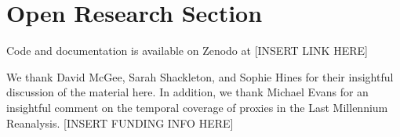 \documentclass[draft]{agujournal2019}
\begin{document}




%
%

\section*{Open Research Section}
Code and documentation is available on Zenodo at [INSERT LINK HERE]

\acknowledgments
We thank David McGee, Sarah Shackleton, and Sophie Hines for their insightful discussion of the material here. In addition, we thank Michael Evans for an insightful comment on the temporal coverage of proxies in the Last Millennium Reanalysis. [INSERT FUNDING INFO HERE] 

\clearpage
%
 
%


%
%
%
%
%


\clearpage
\end{document}

